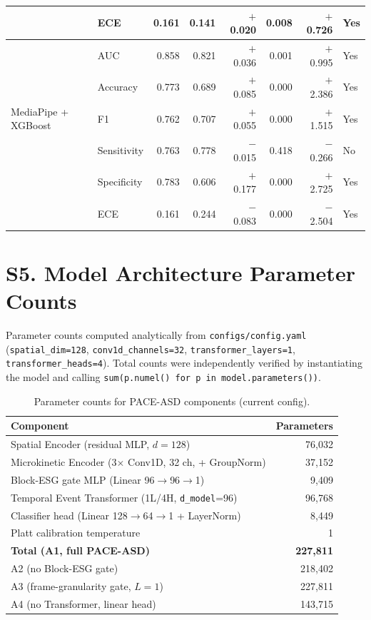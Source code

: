 \documentclass[12pt,a4paper]{article}
\begin{document}
\begin{longtable}{@{}l l r r r r r l@{}}
 & ECE         & 0.161 & 0.141 & $+$0.020 & 0.008 & $+$0.726 & Yes \\
\midrule
\multirow{5}{*}{MediaPipe + XGBoost}
 & AUC         & 0.858 & 0.821 & $+$0.036 & 0.001 & $+$0.995 & Yes \\
 & Accuracy    & 0.773 & 0.689 & $+$0.085 & 0.000 & $+$2.386 & Yes \\
 & F1          & 0.762 & 0.707 & $+$0.055 & 0.000 & $+$1.515 & Yes \\
 & Sensitivity & 0.763 & 0.778 & $-$0.015 & 0.418 & $-$0.266 & No \\
 & Specificity & 0.783 & 0.606 & $+$0.177 & 0.000 & $+$2.725 & Yes \\
 & ECE         & 0.161 & 0.244 & $-$0.083 & 0.000 & $-$2.504 & Yes \\
\end{longtable}

\section{S5. Model Architecture Parameter Counts}
\label{sec:s5}

Parameter counts computed analytically from \texttt{configs/config.yaml}
(\texttt{spatial\_dim=128}, \texttt{conv1d\_channels=32},
\texttt{transformer\_layers=1}, \texttt{transformer\_heads=4}).
Total counts were independently verified by instantiating the model and
calling \texttt{sum(p.numel() for p in model.parameters())}.

\begin{table}[H]
\centering
\caption{Parameter counts for PACE-ASD components (current config).}
\begin{tabular}{@{}l r@{}}
\toprule
Component & Parameters \\
\midrule
Spatial Encoder (residual MLP, $d{=}128$)                    &  76,032 \\
Microkinetic Encoder (3$\times$ Conv1D, 32 ch, + GroupNorm)  &  37,152 \\
Block-ESG gate MLP (Linear 96$\to$96$\to$1)                  &   9,409 \\
Temporal Event Transformer (1L/4H, \texttt{d\_model}=96)     &  96,768 \\
Classifier head (Linear 128$\to$64$\to$1 + LayerNorm)        &   8,449 \\
Platt calibration temperature                                 &       1 \\
\midrule
\textbf{Total (A1, full PACE-ASD)}   & \textbf{227,811} \\
A2 (no Block-ESG gate)               & 218,402 \\
A3 (frame-granularity gate, $L{=}1$) & 227,811 \\
A4 (no Transformer, linear head)     & 143,715 \\
\bottomrule
\end{tabular}
\end{table}
\end{document}
